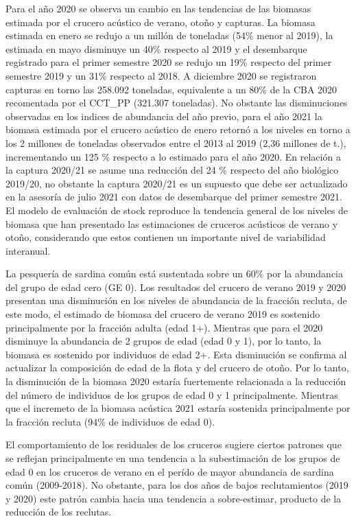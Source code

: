 \documentclass[
  spanish,
]{article}
\begin{document}
Para el año 2020 se observa un cambio en las tendencias de las biomasas
estimada por el crucero acústico de verano, otoño y capturas. La biomasa
estimada en enero se redujo a un millón de toneladas (54\% menor al
2019), la estimada en mayo disminuye un 40\% respecto al 2019 y el
desembarque registrado para el primer semestre 2020 se redujo un 19\%
respecto del primer semestre 2019 y un 31\% respecto al 2018. A
diciembre 2020 se registraron capturas en torno las 258.092 toneladas,
equivalente a un 80\% de la CBA 2020 recomentada por el CCT\_PP (321.307
toneladas). No obstante las disminuciones observadas en los indices de
abundancia del año previo, para el año 2021 la biomasa estimada por el
crucero acústico de enero retornó a los niveles en torno a los 2
millones de toneladas observados entre el 2013 al 2019 (2,36 millones de
t.), incrementando un 125 \% respecto a lo estimado para el año 2020. En
relación a la captura 2020/21 se asume una reducción del 24 \% respecto
del año biológico 2019/20, no obstante la captura 2020/21 es un supuesto
que debe ser actualizado en la asesoría de julio 2021 con datos de
desembarque del primer semestre 2021. El modelo de evaluación de stock
reproduce la tendencia general de los niveles de biomasa que han
presentado las estimaciones de cruceros acústicos de verano y otoño,
considerando que estos contienen un importante nivel de variabilidad
interanual.

La pesquería de sardina común está sustentada sobre un 60\% por la
abundancia del grupo de edad cero (GE 0). Los resultados del crucero de
verano 2019 y 2020 presentan una disminución en los niveles de
abundancia de la fracción recluta, de este modo, el estimado de biomasa
del crucero de verano 2019 es sostenido principalmente por la fracción
adulta (edad 1+). Mientras que para el 2020 disminuye la abundancia de 2
grupos de edad (edad 0 y 1), por lo tanto, la biomasa es sostenido por
individuos de edad 2+. Esta disminución se confirma al actualizar la
composición de edad de la flota y del crucero de otoño. Por lo tanto, la
disminución de la biomasa 2020 estaría fuertemente relacionada a la
reducción del número de individuos de los grupos de edad 0 y 1
principalmente. Mientras que el incremeto de la biomasa acústica 2021
estaría sostenida principalmente por la fracción recluta (94\% de
individuos de edad 0).

El comportamiento de los residuales de los cruceros sugiere ciertos
patrones que se reflejan principalmente en una tendencia a la
subestimación de los grupos de edad 0 en los cruceros de verano en el
perído de mayor abundancia de sardina común (2009-2018). No obstante,
para los dos años de bajos reclutamientos (2019 y 2020) este patrón
cambia hacia una tendencia a sobre-estimar, producto de la reducción de
los reclutas.
\end{document}
